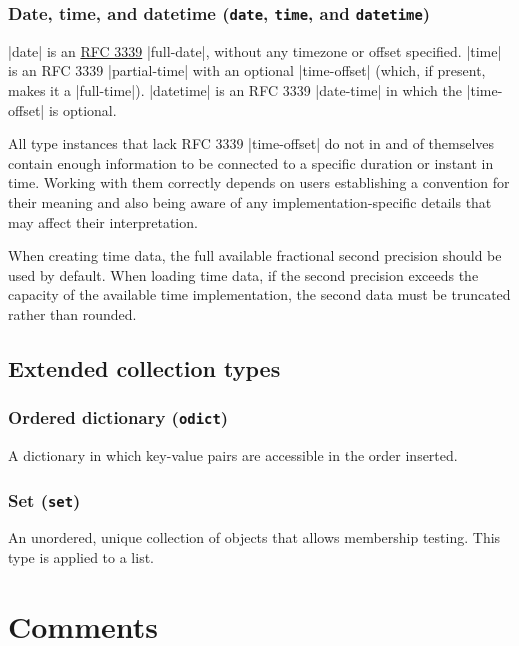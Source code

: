 \documentclass[11pt]{article}
\begin{document}
\subsubsection{Date, time, and datetime (\texttt{date}, \texttt{time}, and \texttt{datetime})}

|date| is an \href{http://tools.ietf.org/html/rfc3339}{RFC 3339} |full-date|, without any timezone or offset specified.  |time| is an RFC 3339 |partial-time| with an optional |time-offset| (which, if present, makes it a |full-time|).  |datetime| is an RFC 3339 |date-time| in which the |time-offset| is optional.

All type instances that lack RFC 3339 |time-offset| do not in and of themselves contain enough information to be connected to a specific duration or instant in time.  Working with them correctly depends on users establishing a convention for their meaning and also being aware of any implementation-specific details that may affect their interpretation.

When creating time data, the full available fractional second precision should be used by default.  When loading time data, if the second precision exceeds the capacity of the available time implementation, the second data must be truncated rather than rounded.



\subsection{Extended collection types}

\subsubsection{Ordered dictionary (\texttt{odict})}

A dictionary in which key-value pairs are accessible in the order inserted.


\subsubsection{Set (\texttt{set})}

An unordered, unique collection of objects that allows membership testing.  This type is applied to a list.



\section{Comments}
\end{document}

